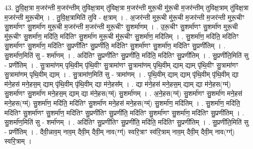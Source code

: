 \documentclass[17pt]{extarticle}
\begin{document}
43. तु॒वि॒क्ष॒त्रा म॒जर॑न्ती म॒जर॑न्तीम् तुविक्ष॒त्राम् तु॑विक्ष॒त्रा म॒जर॑न्ती मुरू॒ची मु॑रू॒ची म॒जर॑न्तीम् तुविक्ष॒त्राम् तु॑विक्ष॒त्रा म॒जर॑न्ती मुरू॒चीम् । . तु॒वि॒क्ष॒त्रामिति॑ तुवि - क्ष॒त्राम् । . अ॒जर॑न्ती मुरू॒ची मु॑रू॒ची म॒जर॑न्ती म॒जर॑न्ती मुरू॒चीꣳ सु॒शर्मा॑णꣳ सु॒शर्मा॑ण मुरू॒ची म॒जर॑न्ती म॒जर॑न्ती मुरू॒चीꣳ सु॒शर्मा॑णम् । . उ॒रू॒चीꣳ सु॒शर्मा॑णꣳ सु॒शर्मा॑ण मुरू॒ची मु॑रू॒चीꣳ सु॒शर्मा॑ण॒ मदि॑ति॒ मदि॑तिꣳ सु॒शर्मा॑ण मुरू॒ची मु॑रू॒चीꣳ सु॒शर्मा॑ण॒ मदि॑तिम् । . सु॒शर्मा॑ण॒ मदि॑ति॒ मदि॑तिꣳ सु॒शर्मा॑णꣳ सु॒शर्मा॑ण॒ मदि॑तिꣳ सु॒प्रणी॑तिꣳ सु॒प्रणी॑ति॒ मदि॑तिꣳ सु॒शर्मा॑णꣳ सु॒शर्मा॑ण॒ मदि॑तिꣳ सु॒प्रणी॑तिम् । . सु॒शर्मा॑ण॒मिति॑ सु - शर्मा॑णम् । . अदि॑तिꣳ सु॒प्रणी॑तिꣳ सु॒प्रणी॑ति॒ मदि॑ति॒ मदि॑तिꣳ सु॒प्रणी॑तिम् । . सु॒प्रणी॑ति॒मिति॑ सु - प्रणी॑तिम् । . सु॒त्रामा॑णम् पृथि॒वीम् पृ॑थि॒वीꣳ सु॒त्रामा॑णꣳ सु॒त्रामा॑णम् पृथि॒वीम् द्याम् द्याम् पृ॑थि॒वीꣳ सु॒त्रामा॑णꣳ सु॒त्रामा॑णम् पृथि॒वीम् द्याम् । . सु॒त्रामा॑ण॒मिति॑ सु - त्रामा॑णम् । . पृ॒थि॒वीम् द्याम् द्याम् पृ॑थि॒वीम् पृ॑थि॒वीम् द्या म॑ने॒हस॑ मने॒हस॒म् द्याम् पृ॑थि॒वीम् पृ॑थि॒वीम् द्या म॑ने॒हस᳚म् । . द्या म॑ने॒हस॑ मने॒हस॒म् द्याम् द्या म॑ने॒हस(ग्म्॑) सु॒शर्मा॑णꣳ सु॒शर्मा॑ण मने॒हस॒म् द्याम् द्या म॑ने॒हस(ग्म्॑) सु॒शर्मा॑णम् । . अ॒ने॒हस(ग्म्॑) सु॒शर्मा॑णꣳ सु॒शर्मा॑ण मने॒हस॑ मने॒हस(ग्म्॑) सु॒शर्मा॑ण॒ मदि॑ति॒ मदि॑तिꣳ सु॒शर्मा॑ण मने॒हस॑ मने॒हस(ग्म्॑) सु॒शर्मा॑ण॒ मदि॑तिम् । . सु॒शर्मा॑ण॒ मदि॑ति॒ मदि॑तिꣳ सु॒शर्मा॑णꣳ सु॒शर्मा॑ण॒ मदि॑तिꣳ सु॒प्रणी॑तिꣳ सु॒प्रणी॑ति॒ मदि॑तिꣳ सु॒शर्मा॑णꣳ सु॒शर्मा॑ण॒ मदि॑तिꣳ सु॒प्रणी॑तिम् । . सु॒शर्मा॑ण॒मिति॑ सु - शर्मा॑णम् । . अदि॑तिꣳ सु॒प्रणी॑तिꣳ सु॒प्रणी॑ति॒ मदि॑ति॒ मदि॑तिꣳ सु॒प्रणी॑तिम् । . सु॒प्रणी॑ति॒मिति॑ सु - प्रणी॑तिम् । . दैवी॒न्नाव॒म् नाव॒म् दैवी॒म् दैवी॒म् नाव(ग्ग्॑) स्वरि॒त्राꣳ स्व॑रि॒त्राम् नाव॒म् दैवी॒म् दैवी॒म् नाव(ग्ग्॑) स्वरि॒त्राम् । \newline
\end{document}

